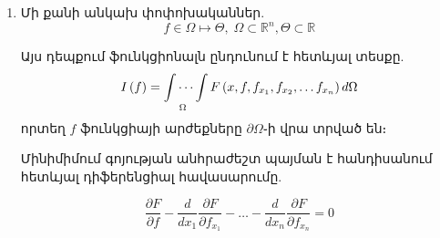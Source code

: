 \documentclass[fleqn, bachelor,subf,12pt,notitlepage]{disser}
\begin{document}
\begin{enumerate}
\item Մի քանի անկախ փոփոխականներ.
$$f \in \Omega \mapsto \Theta, \; \Omega \subset \mathbb{R}^{n}, \Theta \subset \mathbb{R}$$

\noindent Այս դեպքում ֆունկցիոնալն ընդունում է հետևյալ տեսքը.
$$I\left(f\right) = \idotsint \limits_{\Omega} F\left(x, f, f_{x_{1}}, f_{x_{2}}, \dots f_{x_{n} }\right)d\Omega$$
\noindent որտեղ $f$ ֆունկցիայի արժեքները $\partial \Omega$֊ի վրա տրված են։

\noindent Մինիմիմում գոյության անհրաժեշտ պայման է հանդիսանում հետևյալ դիֆերենցիալ հավասարումը.

$$\dfrac{\partial F}{\partial f} - \dfrac{d}{dx_{1}}\dfrac{\partial F}{\partial f_{x_{1}}} - \dots -\dfrac{d}{dx_{n}}\dfrac{\partial F}{\partial f_{x_{n}}}=0$$



\end{enumerate}
\end{document}
